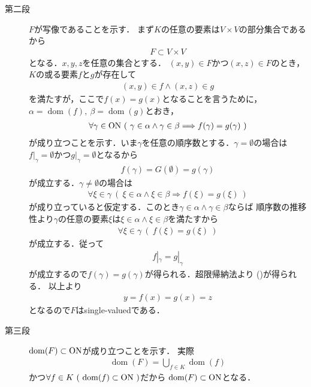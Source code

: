 	\begin{prf}\mbox{}
		\begin{description}
			\item[第二段] $F$が写像であることを示す．
				まず$K$の任意の要素は$V \times V$の部分集合であるから
				\begin{align}
					F \subset V \times V
				\end{align}
				となる．$x,y,z$を任意の集合とする．
				$(x,y) \in F$かつ$(x,z) \in F$のとき，
				$K$の或る要素$f$と$g$が存在して
				\begin{align}
					(x,y) \in f \wedge (x,z) \in g
				\end{align}
				を満たすが，ここで$f(x) = g(x)$となることを言うために，
				$\alpha = \operatorname{dom}(f),\ 
				\beta = \operatorname{dom}(g)$とおき，
				\begin{align}
					\forall \gamma \in \mathrm{ON}\ (\ \gamma \in \alpha \wedge \gamma \in \beta \Longrightarrow f(\gamma) = g(\gamma)\ )
					\label{eq:thm_transfinite_recursion_theorem_1}
				\end{align}
				が成り立つことを示す．いま$\gamma$を任意の順序数とする．$\gamma = \emptyset$の場合は
				$f|_\gamma = \emptyset$かつ$g|_\gamma = \emptyset$となるから
				\begin{align}
					f(\gamma) = G(\emptyset) = g(\gamma)
				\end{align}
				が成立する．$\gamma \neq \emptyset$の場合は
				\begin{align}
					\forall \xi \in \gamma\ (\ \xi \in \alpha \wedge \xi \in \beta \Longrightarrow f(\xi) = g(\xi)\ )
				\end{align}
				が成り立っていると仮定する．このとき$\gamma \in \alpha \wedge \gamma \in \beta$ならば
				順序数の推移性より$\gamma$の任意の要素$\xi$は$\xi \in \alpha \wedge \xi \in \beta$を満たすから
				\begin{align}
					\forall \xi \in \gamma\ (\ f(\xi) = g(\xi)\ )
				\end{align}
				が成立する．従って
				\begin{align}
					f|_\gamma = g|_\gamma
				\end{align}
				が成立するので$f(\gamma) = g(\gamma)$が得られる．超限帰納法より
				()が得られる．
				以上より
				\begin{align}
					y = f(x) = g(x) = z
				\end{align}
				となるので$F$はsingle-valuedである．
			
			\item[第三段] $\operatorname{dom}(F) \subset \mathrm{ON}$が成り立つことを示す．
				実際
				\begin{align}
					\operatorname{dom}(F) = \bigcup_{f \in K} \operatorname{dom}(f)
				\end{align}
				かつ$\forall f \in K\ (\ \operatorname{dom}(f) \subset \mathrm{ON}\ )$だから
				$\operatorname{dom}(F) \subset \mathrm{ON}$となる．
				

\end{description}
\end{prf}
